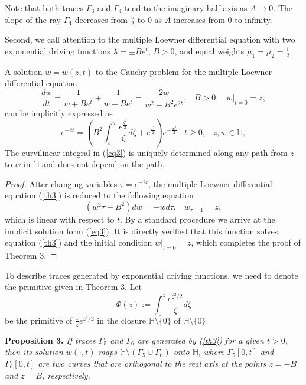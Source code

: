 \documentclass[
11pt,%
tightenlines,%
twoside,%
onecolumn,%
nofloats,%
nobibnotes,%
nofootinbib,%
superscriptaddress,%
noshowpacs,%
centertags]%
{revtex4}
\begin{document}
Note that both traces $\Gamma_3$ and $\Gamma_4$ tend to the imaginary half-axis as $A\to0$. The slope of the ray $\Gamma_4$ decreases from $\frac{\pi}{2}$ to 0 as $A$ increases from 0 to infinity.

Second, we call attention to the multiple Loewner differential equation with two exponential driving functions $\lambda=\pm Be^t$, $B>0$, and equal weights $\mu_1=\mu_2=\frac{1}{2}$.

\begin{theorem} A solution $w=w(z,t)$ to the Cauchy problem for the multiple Loewner differential equation
\begin{equation}
\frac{dw}{dt}=\frac{1}{w+Be^t}+\frac{1}{w-Be^t}=\frac{2w}{w^2-B^2e^{2t}},\;\;\;B>0,\;\;\;w|_{t=0}=z, \label{th3}
\end{equation}
can be implicitly expressed as
\begin{equation}
e^{-2t}=\left(B^2\int_z^w\frac{e^{\frac{\zeta^2}{2}}}{\zeta}d\zeta+e^{\frac{z^2}{2}}\right)e^{-\frac{w^2}{2}}\;\;\;t\geq0,\;\;\;z,w\in\mathbb H, \label{eq3}
\end{equation}
The curvilinear integral in (\ref{eq3}) is uniquely determined along any path from $z$ to $w$ in $\mathbb H$ and does not depend on the path.
\end{theorem}
\begin{proof} After changing variables $\tau=e^{-2t}$, the multiple Loewner differential equation (\ref{th3}) is reduced to the following equation $$(w^2\tau-B^2)dw=-wd\tau,\;\;\;w_{\tau=1}=z,$$ which is linear with respect to $t$. By a standard procedure we arrive at the implicit solution form (\ref{eq3}). It is directly verified that this function solves equation (\ref{th3}) and the initial condition $w|_{t=0}=z$, which completes the proof of Theorem 3.
\end{proof}

To describe traces generated by exponential driving functions, we need to denote the primitive given in Theorem 3. Let $$\Phi(z):=\int^z\frac{e^{\zeta^2/2}}{\zeta}d\zeta$$ be the primitive of $\frac{1}{z}e^{z^2/2}$ in the closure $\overline{\mathbb H\setminus\{0\}}$ of $\mathbb H\setminus\{0\}$.

{\bf Proposition 3.} {\it If traces $\Gamma_5$ and $\Gamma_6$ are generated by (\ref{th3}) for a given $t>0$, then its solution $w(\cdot,t)$ maps $\mathbb H\setminus(\Gamma_5\cup\Gamma_6)$ onto $\mathbb H$, where $\Gamma_5[0,t]$ and $\Gamma_6[0,t]$ are two curves that are orthogonal to the real axis at the points $z=-B$ and $z=B$, respectively.}
\end{document}
